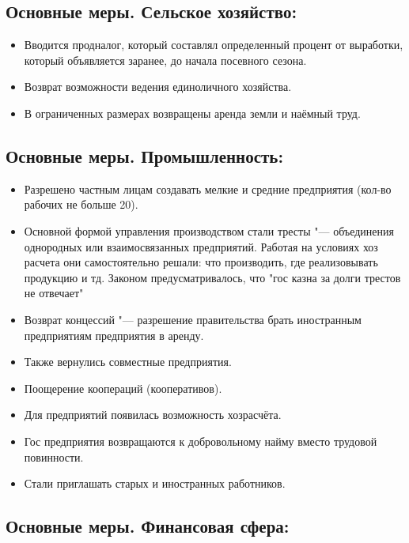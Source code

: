 \subsection{Основные меры. Сельское хозяйство:}

\begin{itemize}
    \item Вводится продналог, который составлял определенный процент от выработки, который объявляется заранее, до начала посевного сезона.
    \item Возврат возможности ведения единоличного хозяйства.
    \item В ограниченных размерах возвращены аренда земли и наёмный труд.
\end{itemize}

\subsection{Основные меры. Промышленность:}

\begin{itemize}
    \item Разрешено частным лицам создавать мелкие и средние предприятия (кол-во рабочих не больше 20).
    \item Основной формой управления производством стали тресты "--- объединения однородных или взаимосвязанных предприятий. Работая на условиях хоз расчета они самостоятельно решали: что производить, где реализовывать продукцию и тд. Законом предусматривалось, что "гос казна за долги трестов не отвечает"
    \item Возврат концессий "--- разрешение правительства брать иностранным предприятиям предприятия в аренду. 
    \item Также вернулись совместные предприятия.
    \item Поощерение коопераций (кооперативов).
    \item Для предприятий появилась возможность хозрасчёта.
    \item Гос предприятия возвращаются к добровольному найму вместо трудовой повинности.
    \item Стали приглашать старых и иностранных работников.
\end{itemize}

\subsection{Основные меры. Финансовая сфера:}

